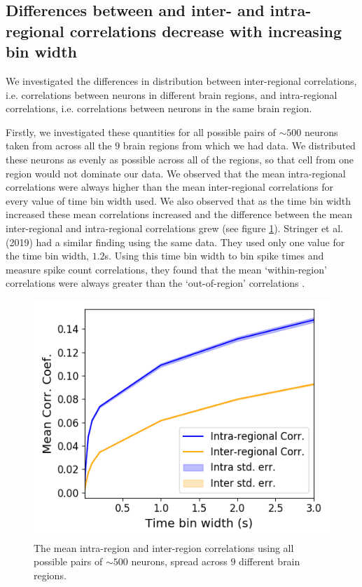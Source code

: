 \documentclass[a4paper,12pt]{article}
\theoremstyle{definition}
\begin{document}
%
  \subsection{Differences between and inter- and intra- regional correlations decrease with increasing bin width}
  We investigated the differences in distribution between inter-regional correlations, i.e. correlations between neurons in different brain regions, and intra-regional correlations, i.e. correlations between neurons in the same brain region.

  Firstly, we investigated these quantities for all possible pairs of $\sim 500$ neurons taken from across all the $9$ brain regions from which we had data. We distributed these neurons as evenly as possible across all of the regions, so that cell from one region would not dominate our data. We observed that the mean intra-regional correlations were always higher than the mean inter-regional correlations for every value of time bin width used. We also observed that as the time bin width increased these mean correlations increased and the difference between the mean inter-regional and intra-regional correlations grew (see figure \ref{fig:all_pairs_inter_intra_corr}). Stringer et al. (2019) had a similar finding using the same data. They used only one value for the time bin width, $1.2$s. Using this time bin width to bin spike times and measure spike count correlations, they found that the mean `within-region' correlations were always greater than the `out-of-region' correlations \cite{stringer}.

  \begin{figure}[h]
    \centering
    \includegraphics[width=0.5\linewidth]{figures/Krebs_inter_intra_regional_correlations.png}
    \caption{The mean intra-region and inter-region correlations using all possible pairs of $\sim 500$ neurons, spread across $9$ different brain regions.}
    \label{fig:all_pairs_inter_intra_corr}
  \end{figure}
\end{document}
